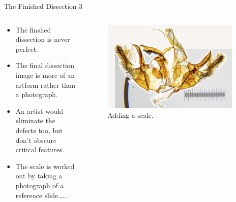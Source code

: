\documentclass[
  ignorenonframetext,
]{beamer}
\providecommand{\tightlist}{%
  \setlength{\itemsep}{0pt}\setlength{\parskip}{0pt}}
\begin{document}
\begin{frame}{The Finished Dissection 3}
\protect\hypertarget{the-finished-dissection-3}{}
\begin{columns}[T]
\begin{column}{0.5\textwidth}
\begin{itemize}
\tightlist
\item
  The finshed dissection is never perfect.
\item
  The final dissection image is more of an artform rather than a
  photograph.
\item
  An artist would eliminate the defects too, but don't obscure critical
  features.
\item
  The scale is worked out by taking a photograph of a reference
  slide\ldots..
\end{itemize}
\end{column}

\begin{column}{0.5\textwidth}
\begin{figure}
\centering
\includegraphics{./images/PJP20220218-001-getting-scale.jpg}
\caption{Adding a scale.}
\end{figure}
\end{column}
\end{columns}
\end{frame}
\end{document}
